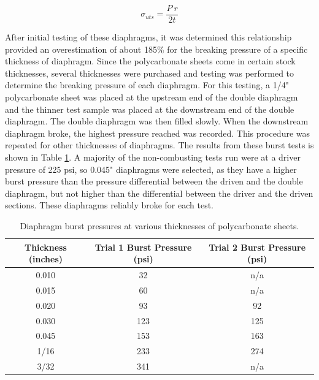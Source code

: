 \begin{equation}
\sigma_{uts} = \frac{P~r}{2t}
\label{eq:spherePV}
\end{equation}

After initial testing of these diaphragms, it was determined this relationship provided an overestimation of about 185\% for the breaking pressure of a specific thickness of diaphragm. Since the polycarbonate sheets come in certain stock thicknesses, several thicknesses were purchased and testing was performed to determine the breaking pressure of each diaphragm. For this testing, a 1/4" polycarbonate sheet was placed at the upstream end of the double diaphragm and the thinner test sample was placed at the downstream end of the double diaphragm. The double diaphragm was then filled slowly. When the downstream diaphragm broke, the highest pressure reached was recorded. This procedure was repeated for other thicknesses of diaphragms. The results from these burst tests is shown in Table \ref{Table:Burst}. A majority of the non-combusting tests run were at a driver pressure of 225 psi, so 0.045" diaphragms were selected, as they have a higher burst pressure than the pressure differential between the driven and the double diaphragm, but not higher than the differential between the driver and the driven sections. These diaphragms reliably broke for each test.

\begin{table}
\centering
\begin{tabular}{|c|c|c|}
\hline
\hline
Thickness (inches) & Trial 1 Burst Pressure (psi) & Trial 2 Burst Pressure (psi)\\ 
\hline \hline
0.010 & 32 & n/a \\

0.015 & 60 & n/a \\

0.020 & 93 & 92 \\

0.030 & 123 & 125 \\

0.045 & 153 & 163 \\

1/16 & 233 & 274 \\

3/32 & 341 & n/a \\

\hline \hline

\end{tabular}
\caption[Diaphragm Burst Pressures]{Diaphragm burst pressures at various thicknesses of polycarbonate sheets.}
\label{Table:Burst}
\end{table}

